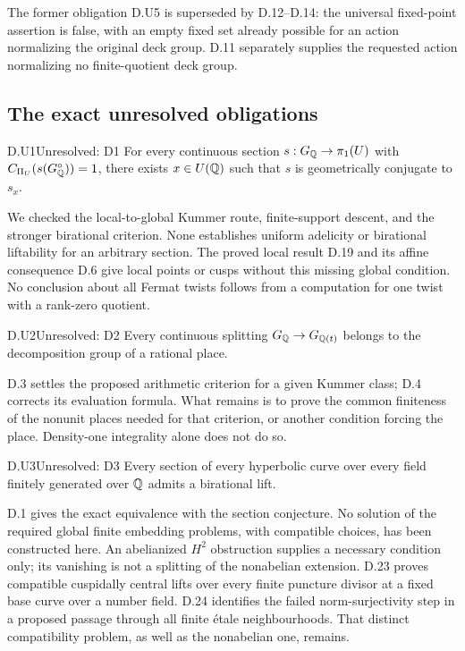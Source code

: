 

The former obligation D.U5 is superseded by D.12--D.14:
the universal fixed-point assertion is false, with an empty
fixed set already possible for an action normalizing the
original deck group. D.11 separately supplies the requested
action normalizing no finite-quotient deck group.










\subsection{The exact unresolved obligations}

\begin{claim}{D.U1}{Unresolved: D1}
For every continuous section $s:G_\mathbb Q\to\pi_1(U)$ with
$C_{\Pi_U}(s(G_\mathbb Q^\circ))=1$, there exists $x\in U(\mathbb Q)$
such that $s$ is geometrically conjugate to $s_x$.
\end{claim}
We checked the local-to-global Kummer route, finite-support descent,
and the stronger birational criterion. None establishes uniform
adelicity or birational liftability for an arbitrary section.
The proved local result D.19 and its affine consequence D.6 give
local points or cusps without this missing global condition.
No conclusion about all Fermat twists follows
from a computation for one twist with a rank-zero quotient.

\begin{claim}{D.U2}{Unresolved: D2}
Every continuous splitting $G_\mathbb Q\to G_{\mathbb Q(t)}$ belongs to the
decomposition group of a rational place.
\end{claim}
D.3 settles the proposed arithmetic criterion for a given Kummer
class; D.4 corrects its evaluation formula. What remains is to
prove the common finiteness of the nonunit places needed for that
criterion, or another condition forcing the place. Density-one
integrality alone does not do so.

\begin{claim}{D.U3}{Unresolved: D3}
Every section of every hyperbolic curve over every field finitely
generated over $\mathbb Q$ admits a birational lift.
\end{claim}
D.1 gives the exact equivalence with the section conjecture. No
solution of the required global finite embedding problems, with
compatible choices, has been constructed here. An abelianized
$H^2$ obstruction supplies a necessary condition only; its
vanishing is not a splitting of the nonabelian extension.
D.23 proves compatible cuspidally central lifts over every finite
puncture divisor at a fixed base curve over a number field.
D.24 identifies the failed norm-surjectivity step in a proposed
passage through all finite \'etale neighbourhoods. That distinct
compatibility problem, as well as the nonabelian one, remains.

